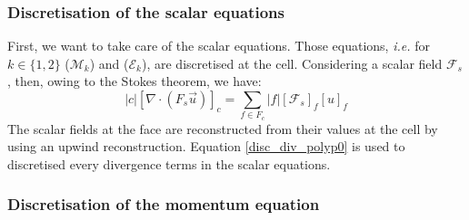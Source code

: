 \subsubsection{Discretisation of the scalar equations}
First, we want to take care of the scalar equations. Those equations, \textit{i.e.} for $k\in \{1,2\} $ ($\mathcal{M}_k$) and ($\mathcal{E}_k$), are discretised at the cell. Considering a scalar field $\mathcal{F}_s$, then, owing to the Stokes theorem, we have:
\begin{equation}
    |c| [\nabla \cdot (F_s \vec{u})]_c = \sum _{f \in F_c} |f| [\mathcal{F}_s]_f [u]_f \label{disc_div_polyp0}
\end{equation}
The scalar fields at the face are reconstructed from their values at the cell by using an upwind reconstruction. Equation \eqref{disc_div_polyp0} is used to discretised every divergence terms in the scalar equations. 

\subsubsection*{Discretisation of the momentum equation}


